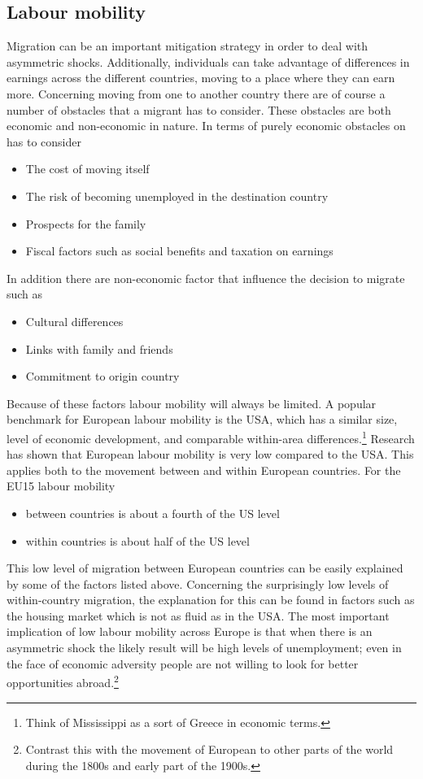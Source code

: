 \documentclass{tufte-handout}
\begin{document}
\subsection{Labour mobility}
Migration can be an important mitigation strategy in order to deal with asymmetric shocks. 
Additionally, individuals can take advantage of differences in earnings across the different countries, moving to a place where they can earn more. 
Concerning moving from one to another country there are of course a number of obstacles that a migrant has to consider. 
These obstacles are both economic and non-economic in nature. 
In terms of purely economic obstacles on has to consider
\begin{itemize}
  \item The cost of moving itself
  \item The risk of becoming unemployed in the destination country
  \item Prospects for the family
  \item Fiscal factors such as social benefits and taxation on earnings
\end{itemize}
In addition there are non-economic factor that influence the decision to migrate such as
\begin{itemize}
  \item Cultural differences
  \item Links with family and friends
  \item Commitment to origin country
\end{itemize}
Because of these factors labour mobility will always be limited. 
A popular benchmark for European labour mobility is the USA, which has a similar size, level of economic development, and comparable within-area differences.\footnote{Think of Mississippi as a sort of Greece in economic terms.}
Research has shown that European labour mobility is very low compared to the USA.
This applies both to the movement between and within European countries. 
For the EU15 labour mobility
\begin{itemize}
  \item between countries is about a fourth of the US level
  \item within countries is about half of the US level
\end{itemize}

This low level of migration between European countries can be easily explained by some of the factors listed above. 
Concerning the surprisingly low levels of within-country migration, the explanation for this can be found in factors such as the housing market which is not as fluid as in the USA.
The most important implication of low labour mobility across Europe is that when there is an asymmetric shock the likely result will be high levels of unemployment; even in the face of economic adversity people are not willing to look for better opportunities abroad.\footnote{Contrast this with the movement of European to other parts of the world during the 1800s and early part of the 1900s.}
\end{document}
